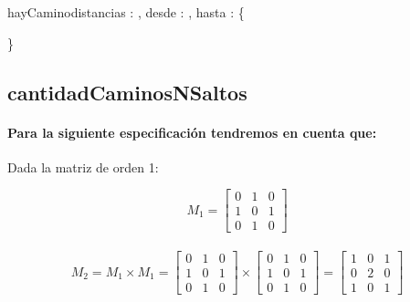 \documentclass[10pt,a4paper]{article}
\begin{document}
\begin{proc}{hayCamino}{\In distancias : \TLista{\TLista{\ent}}, \In desde : \ent, \In hasta : \ent}{\bool \{ } 
	
\end{proc}


\}


\subsection{cantidadCaminosNSaltos}
\paragraph{Para la siguiente especificación tendremos en cuenta que:}{Dada la matriz de orden 1:}

\[
M_{1} = \begin{bmatrix} 0 & 1 & 0 \\	1 & 0 & 1 \\	0 & 1 & 0 \end{bmatrix} \]
\\
\[
M_{2} = M_{1} \times M_{1} =
\begin{bmatrix}	0 & 1 & 0 \\	1 & 0 & 1 \\	0 & 1 & 0\end{bmatrix}
\times
\begin{bmatrix}	0 & 1 & 0 \\	1 & 0 & 1 \\	0 & 1 & 0\end{bmatrix}
=
\begin{bmatrix}	1 & 0 & 1 \\	0 & 2 & 0 \\	1 & 0 & 1\end{bmatrix}
\]
\end{document}
